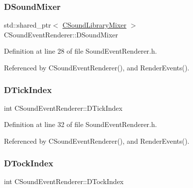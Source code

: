 \subsubsection{\texorpdfstring{D\+Sound\+Mixer}{DSoundMixer}}
{\footnotesize\ttfamily std\+::shared\+\_\+ptr$<$ \hyperlink{classCSoundLibraryMixer}{C\+Sound\+Library\+Mixer} $>$ C\+Sound\+Event\+Renderer\+::\+D\+Sound\+Mixer\hspace{0.3cm}{\ttfamily [protected]}}



Definition at line 28 of file Sound\+Event\+Renderer.\+h.



Referenced by C\+Sound\+Event\+Renderer(), and Render\+Events().

\hypertarget{classCSoundEventRenderer_a810ef7feb31ba13f89919ed78d0cee25}{}\label{classCSoundEventRenderer_a810ef7feb31ba13f89919ed78d0cee25} 
\subsubsection{\texorpdfstring{D\+Tick\+Index}{DTickIndex}}
{\footnotesize\ttfamily int C\+Sound\+Event\+Renderer\+::\+D\+Tick\+Index\hspace{0.3cm}{\ttfamily [protected]}}



Definition at line 32 of file Sound\+Event\+Renderer.\+h.



Referenced by C\+Sound\+Event\+Renderer(), and Render\+Events().

\hypertarget{classCSoundEventRenderer_a93c4c050a9840199ab026018c107e62c}{}\label{classCSoundEventRenderer_a93c4c050a9840199ab026018c107e62c} 
\subsubsection{\texorpdfstring{D\+Tock\+Index}{DTockIndex}}
{\footnotesize\ttfamily int C\+Sound\+Event\+Renderer\+::\+D\+Tock\+Index\hspace{0.3cm}{\ttfamily [protected]}}



